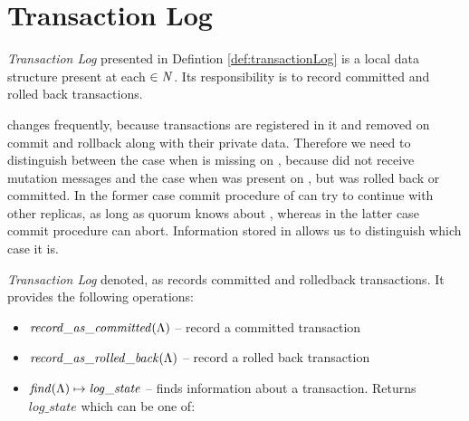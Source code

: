 
\section{Transaction Log}
\label{sec:mpp:transactionLog}
\emph{Transaction Log} presented in Defintion \ref{def:transactionLog} is a local data structure present at each $\in\text{$\mathit{N}$}$. Its responsibility is to record committed and rolled back transactions. 

\txIndex changes frequently, because transactions are registered in it and removed on commit and rollback along with their private data. Therefore we need to distinguish between the case when \transaction is missing on , because  did not receive mutation messages and the case when \transaction was present on , but was rolled back or committed. In the former case commit procedure of \mpt can try to continue with other replicas, as long as quorum knows about \transaction, whereas in the latter case commit procedure can abort. Information stored in \txLog allows us to distinguish which case it is.

\begin{definition}
\label{def:transactionLog}
\emph{Transaction Log} denoted, as \txLog records committed and rolledback transactions. It provides the following operations:
\begin{itemize}
\item $\mathit{record\_as\_committed(\text{$\Lambda$})}$ -- record a committed transaction
\item $\mathit{record\_as\_rolled\_back(\text{$\Lambda$})}$ -- record a rolled back transaction
\item $\mathit{find(\text{$\Lambda$})} \mapsto \mathit{log\_state}$ -- finds information about a transaction. Returns $\mathit{log\_state}$ which can be one of:  
\end{itemize}

\end{definition}
